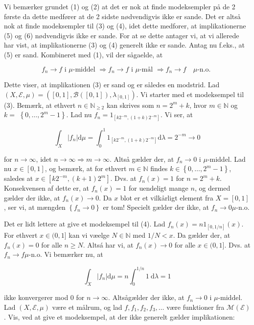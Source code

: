 \documentclass{Class}
\begin{document}
\solution
Vi bemærker grundet (1) og (2) at det er nok at finde modeksempler på de 2 første da dette medfører at de 2 sidste nødvendigvis ikke er sande. 
Det er altså nok at finde modeksempler til (3) og (4), idet dette medforer, at implikationerne (5) og (6) nødvendigvis ikke er sande. For at se dette antager vi, at vi allerede har vist, at implikationerne (3) og (4) generelt ikke er sande. Antag nu f.eks., at (5) er sand. Kombineret med (1), vil der sågaelde, at

$$
f_n \rightarrow f \text { i } \mu \text {-middel } \Longrightarrow f_n \rightarrow f \text { i } \mu \text {-mål } \Longrightarrow f_n \rightarrow f \quad \mu \text {-n.o. }
$$


Dette viser, at implikationen (3) er sand og er således en modstrid.
Lad $(X, \mathcal{E}, \mu)=\left([0,1], \mathcal{B}([0,1]), \lambda_{[0,1]}\right)$. Vi starter med et modeksempel til (3). Bemærk, at ethvert $n \in \mathbb{N}_{\geq 2}$ kan skrives som $n=2^m+k$, hvor $m \in \mathbb{N}$ og $k=$ $\left\{0, \ldots, 2^m-1\right\}$. Lad nu $f_n=1_{\left[k 2^{-m},(1+k) 2^{-m}\right]}$. Vi ser, at

$$
\int_X\left|f_n\right| \mathrm{d} \mu=\int_0^1 1_{\left[k 2^{-m},(1+k) 2^{-m}\right]} \mathrm{d} \lambda=2^{-m} \rightarrow 0
$$

for $n \rightarrow \infty$, idet $n \rightarrow \infty \Longrightarrow m \rightarrow \infty$. Altså gælder der, at $f_n \rightarrow 0$ i $\mu$-middel. Lad nu $x \in[0,1]$, og bemærk, at for ethvert $m \in \mathbb{N}$ findes $k \in\left\{0, \ldots, 2^m-1\right\}$, saledes at $x \in\left[k 2^{-m},(k+1) 2^m\right]$. Dvs. at $f_n(x)=1$ for $n=2^m+k$. Konsekvensen af dette er, at $f_n(x)=1$ for uendeligt mange $n$, og dermed gælder der ikke, at $f_n(x) \rightarrow 0$. Da $x$ blot er et vilkårligt element fra $X=[0,1]$, ser vi, at mængden $\left\{f_n \rightarrow 0\right\}$ er tom! Specielt gælder der ikke, at $f_n \rightarrow 0 \mu$-n.o.

Det er lidt lettere at give et modeksempel til (4). Lad $f_n(x)=n 1_{[0,1 / n]}(x)$. For ethvert $x \in(0,1]$ kan vi væelge $N \in \mathbb{N}$ med $1 / N<x$. Da gælder der, at $f_n(x)=0$ for alle $n \geq N$. Altsá har vi, at $f_n(x) \rightarrow 0$ for alle $x \in(0,1]$. Dvs. at $f_n \rightarrow f \mu$-n.o. Vi bemærker nu, at

$$
\int_X\left|f_n\right| \mathrm{d} \mu=n \int_0^{1 / n} 1 \mathrm{~d} \lambda=1
$$

ikke konvergerer mod 0 for $n \rightarrow \infty$. Altsågælder der ikke, at $f_n \rightarrow 0$ i $\mu$-middel.
Lad $(X, \mathcal{E}, \mu)$ være et målrum, og lad $f, f_1, f_2, f_3, \ldots$ være funktioner fra $\mathcal{M}(\mathcal{E})$. Vis, ved at give et modeksempel, at der ikke generelt gælder implikationen:
\end{document}
